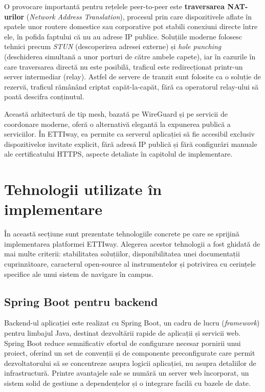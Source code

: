 O provocare importantă pentru rețelele peer-to-peer este \textbf{traversarea
NAT-urilor} (\textit{Network Address Translation}), procesul prin care
dispozitivele aflate în spatele unor routere domestice sau corporative pot
stabili conexiuni directe între ele, în pofida faptului că nu au adrese IP
publice. Soluțiile moderne folosesc tehnici precum \textit{STUN} (descoperirea
adresei externe)\cite{RFC8489} și \textit{hole punching} (deschiderea simultană a unor porturi
de către ambele capete), iar în cazurile în care traversarea directă nu este
posibilă, traficul este redirecționat printr-un server intermediar (relay).
Astfel de servere de tranzit sunt folosite ca o soluție de rezervă, traficul
rămânând criptat capăt-la-capăt, fără ca operatorul relay-ului să poată descifra
conținutul.
 
Această arhitectură de tip mesh, bazată pe WireGuard și pe servicii de
coordonare moderne, oferă o alternativă elegantă la expunerea publică a
serviciilor. În ETTIway, ea permite ca serverul aplicației să fie accesibil
exclusiv dispozitivelor invitate explicit, fără adresă IP publică și fără
configurări manuale ale certificatului HTTPS, aspecte detaliate în capitolul de
implementare.

\section{Tehnologii utilizate în implementare}
\label{sec:tehnologii}

În această secțiune sunt prezentate tehnologiile concrete pe care se sprijină
implementarea platformei ETTIway. Alegerea acestor tehnologii a fost ghidată de
mai multe criterii: stabilitatea soluțiilor, disponibilitatea
unei documentații cuprinzătoare, caracterul open-source al instrumentelor și
potrivirea cu cerințele specifice ale unui sistem de navigare în campus.

\subsection{Spring Boot pentru backend}
\label{subsec:spring-boot}

Backend-ul aplicației este realizat cu Spring Boot, un cadru de lucru
(\textit{framework}) pentru limbajul Java, destinat dezvoltării rapide de
aplicații și servicii web. Spring Boot reduce semnificativ efortul de
configurare necesar pornirii unui proiect, oferind un set de convenții și de
componente preconfigurate care permit dezvoltatorului să se concentreze asupra
logicii aplicației, nu asupra detaliilor de infrastructură. Printre avantajele
sale se numără un server web încorporat, un sistem solid de gestiune a
dependențelor și o integrare facilă cu bazele de date.\cite{SpringBoot}



